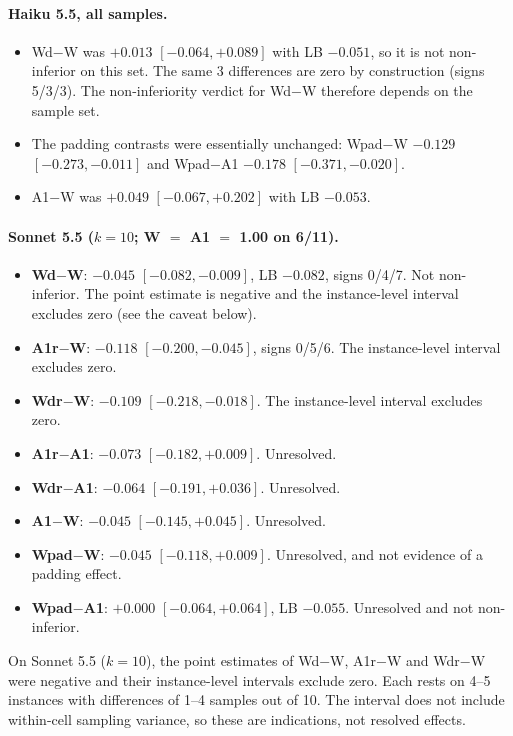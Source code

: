 \paragraph{Haiku 5.5, all samples.}
\begin{itemize}
\item Wd$-$W was $+0.013$ $[-0.064, +0.089]$ with LB $-0.051$, so it is not non-inferior on this set. The same 3 differences are zero by construction (signs 5/3/3). The non-inferiority verdict for Wd$-$W therefore depends on the sample set.
\item The padding contrasts were essentially unchanged: Wpad$-$W $-0.129$ $[-0.273, -0.011]$ and Wpad$-$A1 $-0.178$ $[-0.371, -0.020]$.
\item A1$-$W was $+0.049$ $[-0.067, +0.202]$ with LB $-0.053$.
\end{itemize}

\paragraph{Sonnet 5.5 ($k=10$; W $=$ A1 $=$ 1.00 on 6/11).}
\begin{itemize}
\item \textbf{Wd$-$W}: $-0.045$ $[-0.082, -0.009]$, LB $-0.082$, signs 0/4/7. Not non-inferior. The point estimate is negative and the instance-level interval excludes zero (see the caveat below).
\item \textbf{A1r$-$W}: $-0.118$ $[-0.200, -0.045]$, signs 0/5/6. The instance-level interval excludes zero.
\item \textbf{Wdr$-$W}: $-0.109$ $[-0.218, -0.018]$. The instance-level interval excludes zero.
\item \textbf{A1r$-$A1}: $-0.073$ $[-0.182, +0.009]$. Unresolved.
\item \textbf{Wdr$-$A1}: $-0.064$ $[-0.191, +0.036]$. Unresolved.
\item \textbf{A1$-$W}: $-0.045$ $[-0.145, +0.045]$. Unresolved.
\item \textbf{Wpad$-$W}: $-0.045$ $[-0.118, +0.009]$. Unresolved, and not evidence of a padding effect.
\item \textbf{Wpad$-$A1}: $+0.000$ $[-0.064, +0.064]$, LB $-0.055$. Unresolved and not non-inferior.
\end{itemize}
On Sonnet 5.5 ($k=10$), the point estimates of Wd$-$W, A1r$-$W and Wdr$-$W were negative and their instance-level intervals exclude zero. Each rests on 4--5 instances with differences of 1--4 samples out of 10. The interval does not include within-cell sampling variance, so these are indications, not resolved effects.

